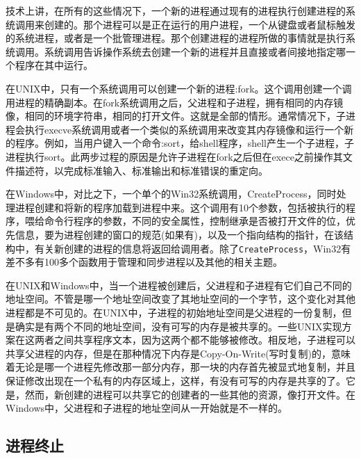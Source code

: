 	技术上讲，在所有的这些情况下，一个新的进程通过现有的进程执行创建进程的系统调用来创建的。那个进程可以是正在运行的用户进程，一个从键盘或者鼠标触发的系统进程，或者是一个批管理进程。那个创建进程的进程所做的事情就是执行系统调用。系统调用告诉操作系统去创建一个新的进程并且直接或者间接地指定哪一个程序在其中运行。
	
	在UNIX中，只有一个系统调用可以创建一个新的进程:fork。这个调用创建一个调用进程的精确副本。在fork系统调用之后，父进程和子进程，拥有相同的内存镜像，相同的环境字符串，相同的打开文件。这就是全部的情形。通常情况下，子进程会执行execve系统调用或者一个类似的系统调用来改变其内存镜像和运行一个新的程序。例如，当用户键入一个命令:sort，给shell程序，shell产生一个子进程，子进程执行sort。此两步过程的原因是允许子进程在fork之后但在exece之前操作其文件描述符，以完成标准输入、标准输出和标准错误的重定向。
	
	在Windows中，对比之下，一个单个的Win32系统调用，CreateProcess，同时处理进程创建和将新的程序加载到进程中来。这个调用有10个参数，包括被执行的程序，喂给命令行程序的参数，不同的安全属性，控制继承是否被打开文件的位，优先信息，要为进程创建的窗口的规范(如果有)，以及一个指向结构的指针，在该结构中，有关新创建的进程的信息将返回给调用者。除了\texttt{CreateProcess}，Win32有差不多有100多个函数用于管理和同步进程以及其他的相关主题。
	
	在UNIX和Windows中，当一个进程被创建后，父进程和子进程有它们自己不同的地址空间。不管是哪一个地址空间改变了其地址空间的一个字节，这个变化对其他进程都是不可见的。在UNIX中，子进程的初始地址空间是父进程的一份复制，但是确实是有两个不同的地址空间，没有可写的内存是被共享的。一些UNIX实现方案在这两者之间共享程序文本，因为这两个都不能够被修改。相反地，子进程可以共享父进程的内存，但是在那种情况下内存是Copy-On-Write(写时复制)的，意味着无论是哪一个进程先修改那一部分内存，那一块的内存首先被显式地复制，并且保证修改出现在一个私有的内存区域上，这样，有没有可写的内存是共享的了。它是，然而，新创建的进程可以共享它的创建者的一些其他的资源，像打开文件。在Windows中，父进程和子进程的地址空间从一开始就是不一样的。
	
	\subsection{进程终止}
	
